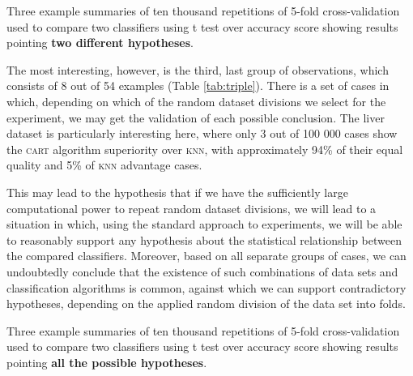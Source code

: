 \documentclass[final,3p,times,onecolumn]{elsarticle}
\begin{document}
\begin{table}[!h]
	\centering
	\caption{Three example summaries of ten thousand repetitions of 5-fold cross-validation used to compare two classifiers using t test over accuracy score showing results pointing \textbf{two different hypotheses}.}

	\label{tab:double}

	\hspace{.03\textwidth}%
	\hspace{.03\textwidth}%
	
\end{table}

The most interesting, however, is the third, last group of observations, which consists of 8 out of 54 examples (Table \ref{tab:triple}). There is a set of cases in which, depending on which of the random dataset divisions we select for the experiment, we may get the validation of each possible conclusion. The liver dataset is particularly interesting here, where only 3 out of 100 000 cases show the \textsc{cart} algorithm superiority over \textsc{knn}, with approximately 94\% of their equal quality and 5\% of \textsc{knn} advantage cases.

This may lead to the hypothesis that if we have the sufficiently large computational power to repeat random dataset divisions, we will lead to a situation in which, using the standard approach to experiments, we will be able to reasonably support any hypothesis about the statistical relationship between the compared classifiers. Moreover, based on all separate groups of cases, we can undoubtedly conclude that the existence of such combinations of data sets and classification algorithms is common, against which we can support contradictory hypotheses, depending on the applied random division of the data set into folds.

\begin{table}[!h]
	\centering

	\caption{Three example summaries of ten thousand repetitions of 5-fold cross-validation used to compare two classifiers using t test over accuracy score showing results pointing \textbf{all the possible hypotheses}.}

	\label{tab:triple}
	\hspace{.03\textwidth}%
	\hspace{.03\textwidth}%
	
\end{table}
\end{document}

